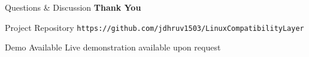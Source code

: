 \documentclass[aspectratio=169, 10pt]{beamer}
\begin{document}
\begin{frame}{Questions \& Discussion}
    \centering
    \vspace{1cm}
    {\Huge \textbf{Thank You}}

    \vspace{0.5cm}
    \begin{block}{Project Repository}
        \centering
        \texttt{https://github.com/jdhruv1503/LinuxCompatibilityLayer}
    \end{block}

    \vspace{0.3cm}

    \vspace{0.5cm}
    \begin{alertblock}{Demo Available}
        \centering
        Live demonstration available upon request
    \end{alertblock}
\end{frame}
\end{document}
